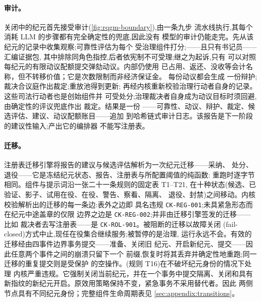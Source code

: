 \paragraph{审计。}
关闭中的纪元首先接受审计(\cref{fig:rqgm-boundary}),由一条九步
流水线执行,其每个消耗 LLM 的步骤都有完全确定性的兜底,因此没有
模型的审计仍能走完。先从该纪元的记录中收集观察;可靠性评估为每个
受治理组件打分;——且只有书记员——汇编证据包,
其中排除同角色指控,后者依宪制不可受理;继之为起诉,只有
可以对照每纪元的有限动议配额提交弹劾动议。内部仍使用
已占用、返还、没收等会计名称，但不转移价值；它是次数限制而非经济保证金。
每份动议都会生成
一份辩护;裁决合议庭作出裁定;重放池得到更新;
再经内核重新校验治理行动者自身的记录。这些司法行动者也是创始组件并
可受处分;治理裁决者自身成为动议目标时须回避,由确定性的评议兜底作出
裁定。结果是一份
——可靠性、动议、辩护、裁定、候选评估、建议、动议配额账目——追加
到哈希链式审计日志。该报告是下一阶段的建议性输入;产出它的编排器
不能写注册表。

\paragraph{迁移。}
注册表迁移引擎将报告的建议与候选评估解析为一次纪元迁移——采纳、
处分、退役——它是冻结纪元状态、报告、注册表与所配置阈值的纯函数:
重跑时逐字节相同。组件与提示词沿一张二十一条规则的固定表 T1--T21,
在十种状态(候选、已验证、影子、试用在役、在役、警告、察看、隔离、
退役、封禁)之间移动。内核校验解析出的迁移的每一条边:表外之边即
具名违规 \texttt{CK-REG-001};未具紧急形态而在纪元中途盖章的仅限
边界之边是 \texttt{CK-REG-002};并非由迁移引擎签发的迁移——比如
裁决者去写注册表——是 \texttt{CK-ROL-901}。被阻断的迁移以故障关闭
(fail-closed)方式中止,现任在役集合继续服务;被暂停的是治理,
运行永远不会。有效的迁移经由四事件边界事务提交——准备、关闭旧
纪元、开启新纪元、提交——因此任意两个事件之间的崩溃只留下一个
前缀,恢复时将其丢弃并确定性地重跑;同一迁移的重复提交则是受保护
的空操作。(规则 T16)在不破坏纪元身份的情况下处理
内核严重违规。它强制关闭当前纪元，并在一个事务中提交隔离、关闭和具有
新指纹的新纪元开启。原效用策略保持不变，紧急事务不采用替代者。因此
两侧节点具有不同纪元身份；完整组件生命周期表见
\cref{sec:appendix:transitions}。

